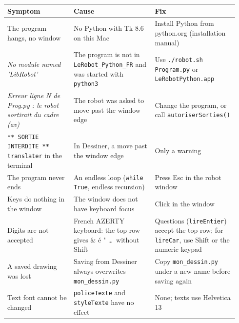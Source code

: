 \documentclass[11pt,a4paper]{article}
\newcommand{\kbd}[1]{\texttt{#1}}
\begin{document}
\begin{longtable}{@{}p{0.27\linewidth} p{0.33\linewidth} p{0.34\linewidth}@{}}
\toprule
\textbf{Symptom} & \textbf{Cause} & \textbf{Fix} \\
\midrule
\endhead
\bottomrule
\endfoot
The program hangs, no window & No Python with Tk 8.6 on this Mac & Install Python from python.org (installation manual) \\
\addlinespace
\emph{No module named 'LibRobot'} & The program is not in \kbd{LeRobot\_Python\_FR} and was started with \kbd{python3} & Use \kbd{./robot.sh Program.py} or \kbd{LeRobotPython.app} \\
\addlinespace
\emph{Erreur ligne N de Prog.py : le robot sortirait du cadre (av)} & The robot was asked to move past the window edge & Change the program, or call \kbd{autoriserSorties()} \\
\addlinespace
\kbd{** SORTIE INTERDITE ** translater} in the terminal & In Dessiner, a move past the window edge & Only a warning \\
\addlinespace
The program never ends & An endless loop (\kbd{while True}, endless recursion) & Press Esc in the robot window \\
\addlinespace
Keys do nothing in the window & The window does not have keyboard focus & Click in the window \\
\addlinespace
Digits are not accepted & French AZERTY keyboard: the top row gives \& é " \dots\ without Shift & Questions (\kbd{lireEntier}) accept the top row; for \kbd{lireCar}, use Shift or the numeric keypad \\
\addlinespace
A saved drawing was lost & Saving from Dessiner always overwrites \kbd{mon\_dessin.py} & Copy \kbd{mon\_dessin.py} under a new name before saving again \\
\addlinespace
Text font cannot be changed & \kbd{policeTexte} and \kbd{styleTexte} have no effect & None; texts use Helvetica 13 \\
\end{longtable}
\end{document}
